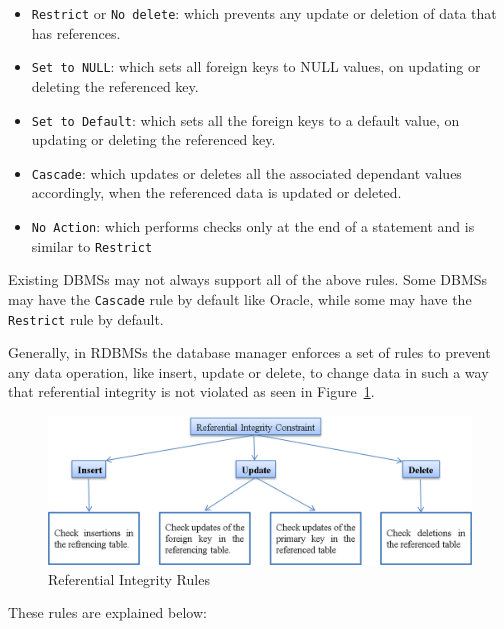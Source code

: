 	\begin{itemize}
	
		\item \texttt{Restrict} or \texttt{No delete}: which prevents any update or
		deletion of data that has references. 
		
		\item \texttt{Set to NULL}: which sets all foreign keys to NULL values,   on
		updating or deleting the referenced key. 
		
		\item \texttt{Set to Default}: which sets all the foreign
		keys to a default value,   on updating or deleting the referenced key. 
		
		\item \texttt{Cascade}: which updates or deletes all the
		associated dependant values accordingly,   when the referenced data is updated or
		deleted. 
		
		\item \texttt{No Action}: which performs checks only at the end of a
		statement and is similar to \texttt{Restrict}
		
	\end{itemize}

Existing \acp{DBMS} may not always support all of the above rules.  Some \acp{DBMS} may
have the \texttt{Cascade} rule by default like Oracle,   while some may have the
\texttt{Restrict} rule by default.  

Generally,   in \acp{RDBMS} the database manager enforces a set of rules to
prevent any data operation,   like insert,   update or delete,   to change data
in such a way that referential integrity is not violated as seen in
Figure~\ref{f:RI}. 

	\begin{figure}[H]
		\centering
		\includegraphics[width=.8\textwidth]{./figure/Example/RI-Figure.png}
		\caption{Referential Integrity Rules}\label{f:RI}
	\end{figure}

These rules are explained below:

